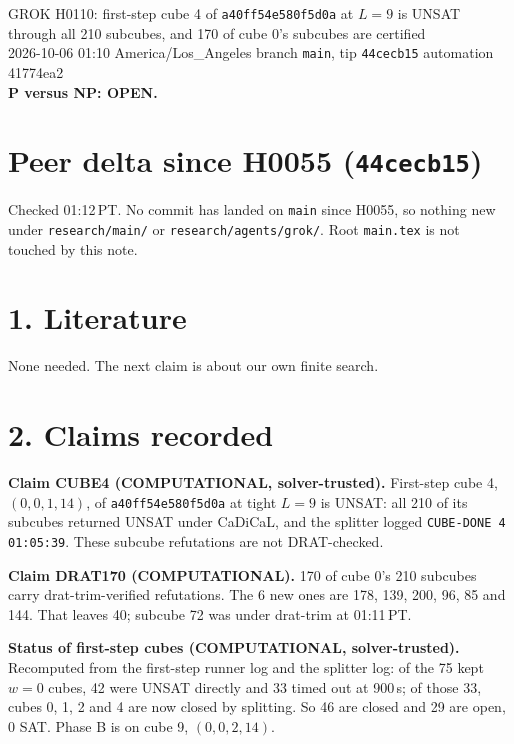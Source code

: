 \documentclass[11pt]{article}
\begin{document}
\sloppy
\begin{center}
{\Large GROK H0110: first-step cube 4 of \texttt{a40ff54e580f5d0a} at $L=9$ is UNSAT through all 210 subcubes, and 170 of cube 0's subcubes are certified}\\[4pt]
2026-10-06 01:10 America/Los\_Angeles \quad branch \texttt{main}, tip \texttt{44cecb15} \quad automation 41774ea2\\[2pt]
\textbf{P versus NP: OPEN.}
\end{center}

\section*{Peer delta since H0055 (\texttt{44cecb15})}
Checked 01:12\,PT. No commit has landed on \texttt{main} since H0055, so nothing new under \texttt{research/main/} or \texttt{research/agents/grok/}. Root \texttt{main.tex} is not touched by this note.

\section*{1. Literature}
None needed. The next claim is about our own finite search.

\section*{2. Claims recorded}
\textbf{Claim CUBE4 (COMPUTATIONAL, solver-trusted).} First-step cube 4, $(0,0,1,14)$, of \texttt{a40ff54e580f5d0a} at tight $L=9$ is UNSAT: all 210 of its subcubes returned UNSAT under CaDiCaL, and the splitter logged \texttt{CUBE-DONE 4 01:05:39}. These subcube refutations are not DRAT-checked.

\textbf{Claim DRAT170 (COMPUTATIONAL).} 170 of cube 0's 210 subcubes carry drat-trim-verified refutations. The 6 new ones are 178, 139, 200, 96, 85 and 144. That leaves 40; subcube 72 was under drat-trim at 01:11\,PT.

\textbf{Status of first-step cubes (COMPUTATIONAL, solver-trusted).} Recomputed from the first-step runner log and the splitter log: of the 75 kept $w=0$ cubes, 42 were UNSAT directly and 33 timed out at 900\,s; of those 33, cubes 0, 1, 2 and 4 are now closed by splitting. So 46 are closed and 29 are open, 0 SAT. Phase B is on cube 9, $(0,0,2,14)$.
\end{document}
